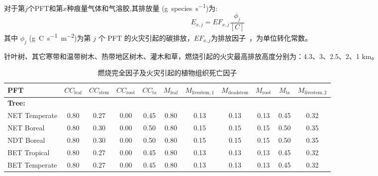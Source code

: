 对于第$j$个PFT和第$x$种痕量气体和气溶胶,其排放量 (\unit{g.species.s^{-1}})为:
\begin{equation}
  E_{x,j}=E F_{x,j} \frac{\phi_{j}}{[C]}
\end{equation}
其中 $\phi_{j}$ (\unit{g.C.s^{-1}.m^{-2}})为第 $j$ 个 PFT 的火灾引起的碳排放，$E F_{x,j}$为排放因子~\citep{LiF2019}，为单位转化常数。


针叶树、其它寒带和温带树木、热带地区树木、灌木和草，燃烧引起的火灾最高排放高度分别为：4.3、3、2.5、2、1 km。

\begin{landscape}
  \begin{table}[htbp]
    \caption{燃烧完全因子及火灾引起的植物组织死亡因子}
    \label{tab:burning_factors}
    \begin{tabular}{lcccccccccc}
      \toprule
      PFT                                   & $CC_{\mathrm{leaf}}$ & $CC_{\mathrm{stem}}$ & $CC_{\mathrm{root}}$ & $CC_{\mathrm{ts}}$ & $M_{\mathrm{leaf}}$ & $M_{\mathrm{livestem,1}}$ & $M_{\mathrm{deadstem}}$ & $M_{\mathrm{root}}$ & $M_{\mathrm{ts}}$ & $M_{\mathrm{livestem,2}}$ \\ \midrule
      \multicolumn{11}{l}{\textbf{Tree:}}  \\
      NET Temperate                         & 0.80                 & 0.27                 & 0.00                 & 0.45               & 0.80                & 0.13                      & 0.13                    & 0.13                & 0.45              & 0.32                      \\
      NET Boreal                            & 0.80                 & 0.30                 & 0.00                 & 0.50               & 0.80                & 0.15                      & 0.15                    & 0.15                & 0.50              & 0.35                      \\
      NDT Boreal                            & 0.80                 & 0.30                 & 0.00                 & 0.50               & 0.80                & 0.15                      & 0.15                    & 0.15                & 0.50              & 0.35                      \\
      BET Tropical                          & 0.80                 & 0.27                 & 0.00                 & 0.45               & 0.80                & 0.13                      & 0.13                    & 0.13                & 0.45              & 0.32                      \\
      BET Temperate                         & 0.80                 & 0.27                 & 0.00                 & 0.45               & 0.80                & 0.13                      & 0.13                    & 0.13                & 0.45              & 0.32                      \\

\end{tabular}
\end{table}
\end{landscape}
